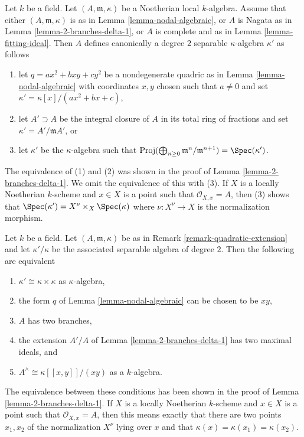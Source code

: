 \begin{remark}
\label{remark-quadratic-extension}
Let $k$ be a field. Let $(A, \mathfrak m, \kappa)$ be a
Noetherian local $k$-algebra. Assume that either
$(A, \mathfrak m, \kappa)$ is as in Lemma \ref{lemma-nodal-algebraic}, or
$A$ is Nagata as in Lemma \ref{lemma-2-branches-delta-1}, or
$A$ is complete and as in Lemma \ref{lemma-fitting-ideal}.
Then $A$ defines canonically a degree $2$ separable $\kappa$-algebra
$\kappa'$ as follows
\begin{enumerate}
\item let $q = ax^2 + bxy + cy^2$ be a nondegenerate quadric
as in Lemma \ref{lemma-nodal-algebraic} with coordinates $x, y$ chosen
such that $a \not = 0$ and set
$\kappa' = \kappa[x]/(ax^2 + bx + c)$,
\item let $A' \supset A$ be the integral closure of $A$ in its
total ring of fractions and set $\kappa' = A'/\mathfrak m A'$, or
\item let $\kappa'$ be the $\kappa$-algebra such that
$\text{Proj}(\bigoplus_{n \geq 0} \mathfrak m^n/\mathfrak m^{n + 1}) =
\Spec(\kappa')$.
\end{enumerate}
The equivalence of (1) and (2) was shown in the proof of
Lemma \ref{lemma-2-branches-delta-1}. We omit the equivalence of
this with (3). If $X$ is a locally Noetherian $k$-scheme and $x \in X$
is a point such that $\mathcal{O}_{X, x} = A$, then (3) shows that
$\Spec(\kappa') = X^\nu \times_X \Spec(\kappa)$ where $\nu : X^\nu \to X$
is the normalization morphism.
\end{remark}

\begin{remark}
\label{remark-trivial-quadratic-extension}
Let $k$ be a field. Let $(A, \mathfrak m, \kappa)$ be as in
Remark \ref{remark-quadratic-extension} and let $\kappa'/\kappa$
be the associated separable algebra of degree $2$.
Then the following are equivalent
\begin{enumerate}
\item $\kappa' \cong \kappa \times \kappa$ as $\kappa$-algebra,
\item the form $q$ of Lemma \ref{lemma-nodal-algebraic}
can be chosen to be $xy$,
\item $A$ has two branches,
\item the extension $A'/A$ of Lemma \ref{lemma-2-branches-delta-1}
has two maximal ideals, and
\item $A^\wedge \cong \kappa[[x, y]]/(xy)$ as a $k$-algebra.
\end{enumerate}
The equivalence between these conditions has been shown in the
proof of Lemma \ref{lemma-2-branches-delta-1}. If $X$ is a
locally Noetherian $k$-scheme and $x \in X$ is a point such that
$\mathcal{O}_{X, x} = A$, then this means exactly that
there are two points $x_1, x_2$ of the normalization $X^\nu$
lying over $x$ and that $\kappa(x) = \kappa(x_1) = \kappa(x_2)$.
\end{remark}

